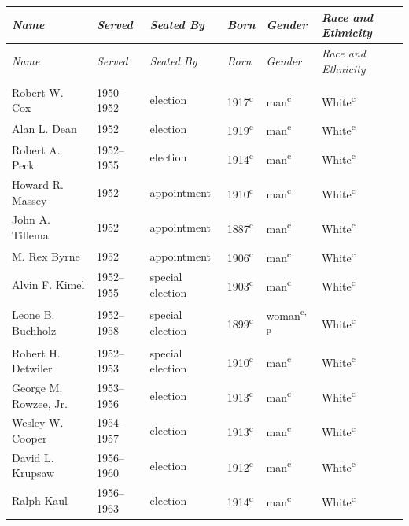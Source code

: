 \begin{longtable}{Q}
\toprule \textit{Name} & \textit{Served} & \textit{Seated By} & \textit{Born} & \textit{Gender} & \textit{Race and Ethnicity} \\ \midrule \endfirsthead
\toprule \textit{Name} & \textit{Served} & \textit{Seated By} & \textit{Born} & \textit{Gender} & \textit{Race and Ethnicity} \\ \midrule \endhead
\bottomrule \endfoot
{} \\*
Robert W. Cox & 1950--1952 & election & 1917\textsuperscript{c} & man\textsuperscript{c} & White\textsuperscript{c} \\*
Alan L. Dean & 1952 & election & 1919\textsuperscript{c} & man\textsuperscript{c} & White\textsuperscript{c} \\
Robert A. Peck & 1952--1955 & election & 1914\textsuperscript{c} & man\textsuperscript{c} & White\textsuperscript{c} \\
Howard R. Massey & 1952 & appointment & 1910\textsuperscript{c} & man\textsuperscript{c} & White\textsuperscript{c} \\
John A. Tillema & 1952 & appointment & 1887\textsuperscript{c} & man\textsuperscript{c} & White\textsuperscript{c} \\
M. Rex Byrne & 1952 & appointment & 1906\textsuperscript{c} & man\textsuperscript{c} & White\textsuperscript{c} \\
Alvin F. Kimel & 1952--1955 & special election & 1903\textsuperscript{c} & man\textsuperscript{c} & White\textsuperscript{c} \\
Leone B. Buchholz & 1952--1958 & special election & 1899\textsuperscript{c} & woman\textsuperscript{c,\,p} & White\textsuperscript{c} \\
Robert H. Detwiler & 1952--1953 & special election & 1910\textsuperscript{c} & man\textsuperscript{c} & White\textsuperscript{c} \\
George M. Rowzee, Jr. & 1953--1956 & election & 1913\textsuperscript{c} & man\textsuperscript{c} & White\textsuperscript{c} \\
Wesley W. Cooper & 1954--1957 & election & 1913\textsuperscript{c} & man\textsuperscript{c} & White\textsuperscript{c} \\
David L. Krupsaw & 1956--1960 & election & 1912\textsuperscript{c} & man\textsuperscript{c} & White\textsuperscript{c} \\
Ralph Kaul & 1956--1963 & election & 1914\textsuperscript{c} & man\textsuperscript{c} & White\textsuperscript{c} \\

\end{longtable}
